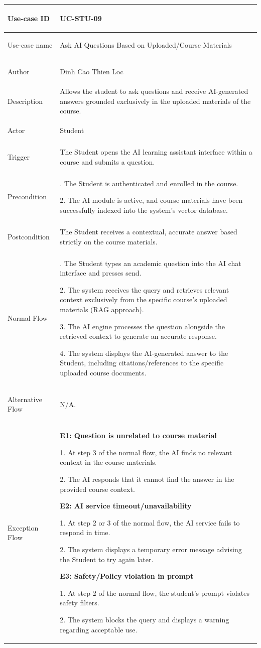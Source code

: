 {
\renewcommand{\arraystretch}{1.1}
\setlength{\tabcolsep}{8pt}
\begin{longtable}{|>{\bfseries\raggedright\arraybackslash}p{}|>{\raggedright\arraybackslash}p{}|}
\hline
Use-case ID & UC-STU-09 \\ \hline
Use-case name & Ask AI Questions Based on Uploaded/Course Materials \\ \hline
Author & Dinh Cao Thien Loc \\ \hline
Description & Allows the student to ask questions and receive AI-generated answers grounded exclusively in the uploaded materials of the course. \\ \hline
Actor & Student \\ \hline
Trigger & The Student opens the AI learning assistant interface within a course and submits a question. \\ \hline
Precondition &
1. The Student is authenticated and enrolled in the course. \par
2. The AI module is active, and course materials have been successfully indexed into the system's vector database. \\ \hline
Postcondition & The Student receives a contextual, accurate answer based strictly on the course materials. \\ \hline
Normal Flow &
1. The Student types an academic question into the AI chat interface and presses send. \par
2. The system receives the query and retrieves relevant context exclusively from the specific course's uploaded materials (RAG approach). \par
3. The AI engine processes the question alongside the retrieved context to generate an accurate response. \par
4. The system displays the AI-generated answer to the Student, including citations/references to the specific uploaded course documents. \\ \hline
Alternative Flow & N/A. \\ \hline
Exception Flow &
\textbf{E1: Question is unrelated to course material} \par
1. At step 3 of the normal flow, the AI finds no relevant context in the course materials. \par
2. The AI responds that it cannot find the answer in the provided course context. \par\vspace{4pt}
\textbf{E2: AI service timeout/unavailability} \par
1. At step 2 or 3 of the normal flow, the AI service fails to respond in time. \par
2. The system displays a temporary error message advising the Student to try again later. \par\vspace{4pt}
\textbf{E3: Safety/Policy violation in prompt} \par
1. At step 2 of the normal flow, the student's prompt violates safety filters. \par
2. The system blocks the query and displays a warning regarding acceptable use. \\ \hline
\end{longtable}
}

